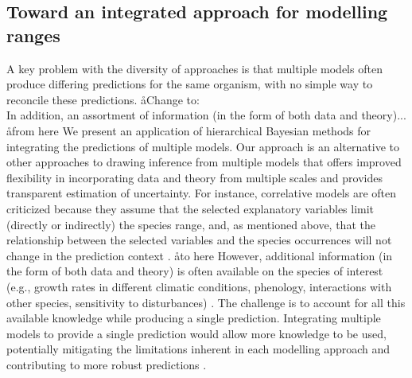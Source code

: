 \subsection*{Toward an integrated approach for modelling ranges}
A key problem with the diversity of approaches is that multiple models often produce differing predictions for the same organism, with no simple way to reconcile these predictions.
\aa{Change to: \\
In addition, an assortment of information (in the form of both data and theory)...}
\aa{from here}
We present an application of hierarchical Bayesian methods for integrating the predictions of multiple models.
Our approach is an alternative to other approaches to drawing inference from multiple models that offers improved flexibility in incorporating data and theory from multiple scales and provides transparent estimation of uncertainty.
For instance, correlative models are often criticized because they assume that the selected explanatory variables limit (directly or indirectly) the species range, and, as mentioned above, that the relationship between the selected variables and the species occurrences will not change in the prediction context \citep{Araujo2006, Berteaux2006, Braunisch2013}.
\aa{to here}
However, additional information (in the form of both data and theory) is often available on the species of interest (e.g., growth rates in different climatic conditions, phenology, interactions with other species, sensitivity to disturbances) \citep{Holt2009, Thuiller2013}. 
The challenge is to account for all this available knowledge while producing a single prediction.
Integrating multiple models to provide a single prediction would allow more knowledge to be used, potentially mitigating the limitations inherent in each modelling approach and contributing to more robust predictions \citep{Pearson2003, Guisan2005, Araujo2006, Quillet2010}.

